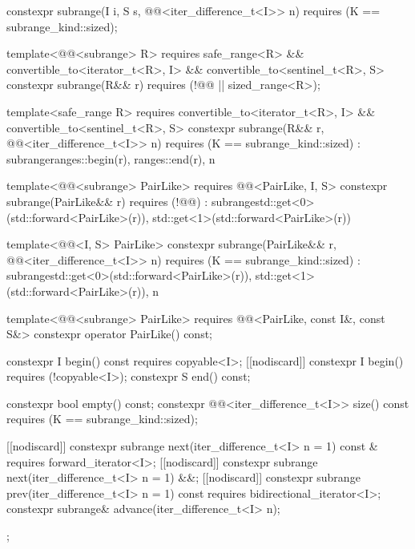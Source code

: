 \begin{codeblock}
{{    constexpr subrange(I i, S s, @@<iter_difference_t<I>> n)
      requires (K == subrange_kind::sized);

    template<@@<subrange> R>
      requires safe_range<R> &&
               convertible_to<iterator_t<R>, I> && convertible_to<sentinel_t<R>, S>
    constexpr subrange(R&& r) requires (!@@ || sized_range<R>);

    template<safe_range R>
      requires convertible_to<iterator_t<R>, I> && convertible_to<sentinel_t<R>, S>
    constexpr subrange(R&& r, @@<iter_difference_t<I>> n)
      requires (K == subrange_kind::sized)
        : subrange{ranges::begin(r), ranges::end(r), n}
    {}

    template<@@<subrange> PairLike>
      requires @@<PairLike, I, S>
    constexpr subrange(PairLike&& r) requires (!@@)
      : subrange{std::get<0>(std::forward<PairLike>(r)),
                 std::get<1>(std::forward<PairLike>(r))}
    {}

    template<@@<I, S> PairLike>
    constexpr subrange(PairLike&& r, @@<iter_difference_t<I>> n)
      requires (K == subrange_kind::sized)
      : subrange{std::get<0>(std::forward<PairLike>(r)),
                 std::get<1>(std::forward<PairLike>(r)), n}
    {}

    template<@@<subrange> PairLike>
      requires @@<PairLike, const I&, const S&>
    constexpr operator PairLike() const;

    constexpr I begin() const requires copyable<I>;
    [[nodiscard]] constexpr I begin() requires (!copyable<I>);
    constexpr S end() const;

    constexpr bool empty() const;
    constexpr @@<iter_difference_t<I>> size() const
      requires (K == subrange_kind::sized);

    [[nodiscard]] constexpr subrange next(iter_difference_t<I> n = 1) const &
      requires forward_iterator<I>;
    [[nodiscard]] constexpr subrange next(iter_difference_t<I> n = 1) &&;
    [[nodiscard]] constexpr subrange prev(iter_difference_t<I> n = 1) const
      requires bidirectional_iterator<I>;
    constexpr subrange& advance(iter_difference_t<I> n);
  };

}
\end{codeblock}
